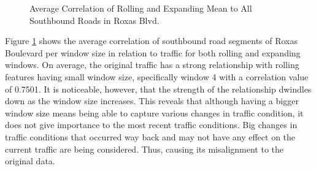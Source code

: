 \begin{figure}[h] 
\centering
  \centering
  \caption{Average Correlation of Rolling and Expanding Mean to All Southbound Roads in Roxas Blvd.}
  \label{heatmap_roxas}
\end{figure}

Figure \ref{heatmap_roxas} shows the average correlation of southbound road segments of Roxas Boulevard per window size in relation to traffic for both rolling and expanding windows. On average, the original traffic has a strong relationship with rolling features having small window size, specifically window 4 with a correlation value of 0.7501. It is noticeable, however, that the strength of the relationship dwindles down as the window size increases. This reveals that although having a bigger window size means being able to capture various changes in traffic condition, it does not give importance to the most recent traffic conditions. Big changes in traffic conditions that occurred way back and may not have any effect on the current traffic are being considered. Thus, causing its misalignment to the original data. 

